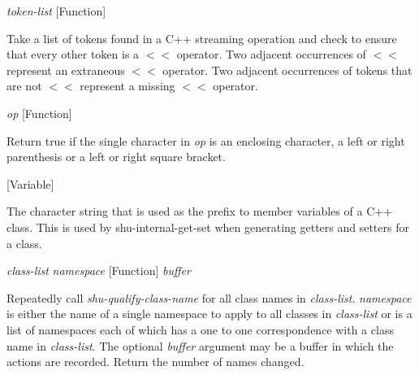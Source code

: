\vspace{1em}
\noindent
{}
\usebox{\funcname}\emph{token-list}
 \hfill [Function]

\begin{doc-string}
Take a list of tokens found in a C++ streaming operation and check to
ensure that every other token is a $<$$<$ operator.  Two adjacent occurrences of $<$$<$
represent an extraneous $<$$<$ operator.  Two adjacent occurrences of tokens that
are not $<$$<$ represent a missing $<$$<$ operator.
\end{doc-string}

\vspace{1em}
\noindent
{}
\usebox{\funcname}\emph{op}
 \hfill [Function]

\begin{doc-string}
Return true if the single character in \emph{op} is an enclosing character, a left
or right parenthesis or a left or right square bracket.
\end{doc-string}

\vspace{1em}
\noindent
{}
\usebox{\funcname}
 \hfill [Variable]

\begin{doc-string}
The character string that is used as the prefix to member variables of a C++ class.
This is used by shu-internal-get-set when generating getters and setters for a class.
\end{doc-string}

\vspace{1em}
\noindent
{}
\usebox{\funcname}\emph{class-list} \emph{namespace}
 \hfill [Function]
\hspace*{\wd\funcname}\emph{buffer}

\begin{doc-string}
Repeatedly call \emph{shu-qualify-class-name} for all class names in \emph{class-list}.
\emph{namespace} is either the name of a single namespace to apply to all classes
in \emph{class-list} or is a list of namespaces each of which has a one to one
correspondence with a class name in \emph{class-list}.  The optional \emph{buffer}
argument may be a buffer in which the actions are recorded.  Return the
number of names changed.
\end{doc-string}

